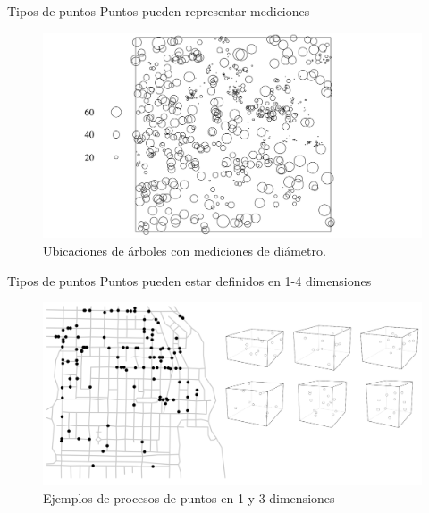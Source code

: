 \documentclass[
  11pt,
  ignorenonframetext,
]{beamer}
\begin{document}
\begin{frame}{Tipos de puntos}
\protect\hypertarget{tipos-de-puntos-1}{}
Puntos pueden representar mediciones

\begin{figure}
\centering
\includegraphics{Figuras/Tipos-puntos-med.png}
\caption{Ubicaciones de árboles con mediciones de diámetro.}
\end{figure}
\end{frame}

\begin{frame}{Tipos de puntos}
\protect\hypertarget{tipos-de-puntos-2}{}
Puntos pueden estar definidos en 1-4 dimensiones

\begin{figure}
\centering
\includegraphics{Figuras/1-3D.png}
\caption{Ejemplos de procesos de puntos en 1 y 3 dimensiones}
\end{figure}
\end{frame}
\end{document}
